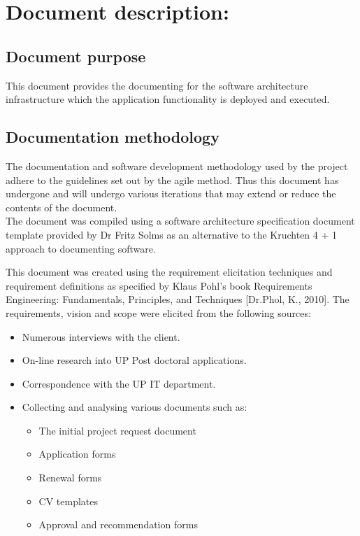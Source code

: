 \documentclass[12pt]{article}
\begin{document}
\listoffigures
\newpage

\section{Document description:}%

\subsection{Document purpose}
\vspace{0.2in}
This document provides the documenting for the software architecture infrastructure which the application functionality is deployed and executed.

\vspace{0.2in}

\subsection{Documentation methodology}
\vspace{0.2in}
\begin{flushleft}
The documentation and software development methodology used by the project adhere to the guidelines set out by the agile method. Thus this document has undergone and will undergo various iterations that may extend or reduce the contents of the document.\\

The document was compiled using a software architecture specification document template provided by Dr Fritz Solms as an alternative to the Kruchten 4 + 1 approach to documenting software.

This document was created using the requirement elicitation techniques and requirement definitions as specified by Klaus Pohl’s book Requirements Engineering: Fundamentals, Principles, and Techniques [Dr.Phol, K., 2010].
The requirements, vision and scope were elicited from the following sources:
\begin{itemize}
	\item Numerous interviews with the client.
	\item On-line research into UP Post doctoral applications.
	\item Correspondence with the UP IT department.
	\item Collecting and analysing various documents such as:
		\begin{itemize}
			\item The initial project request document
			\item Application forms
			\item Renewal forms
			\item CV templates
			\item Approval and recommendation forms
		\end{itemize}
\end{itemize}
\end{flushleft}	
\end{document}
